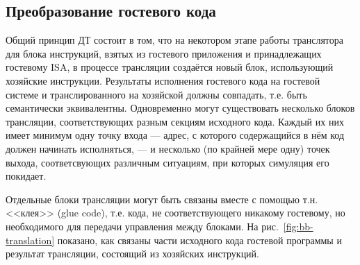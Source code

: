 \subsection{Преобразование гостевого кода}

Общий принцип ДТ состоит в том, что на некотором этапе работы транслятора для блока инструкций, взятых из гостевого приложения и принадлежащих гостевому ISA, в процессе трансляции создаётся новый блок, использующий хозяйские инструкции. Результаты исполнения гостевого кода на гостевой системе и транслированного на хозяйской должны совпадать, т.е. быть семантически эквивалентны. Одновременно могут существовать несколько блоков трансляции, соответствующих разным секциям исходного кода. Каждый их них имеет минимум одну точку входа --- адрес, с которого содержащийся в нём код должен начинать исполняться, --- и несколько (по крайней мере одну) точек выхода, соответсвующих различным ситуациям, при которых симуляция его покидает.

Отдельные блоки трансляции могут быть связаны вместе с помощью т.н. <<клея>> (\abbr glue code), т.е. кода, не соответствующего никакому гостевому, но необходимого для передачи управления между блоками. На рис.~\ref{fig:bb-translation} показано, как связаны части исходного кода гостевой программы и результат трансляции, состоящий из хозяйских инструкций. 

